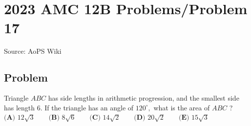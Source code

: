 \documentclass[12pt]{article}
\begin{document}
\section*{{2023 AMC 12B Problems/Problem 17}}
Source: AoPS Wiki

\subsection*{Problem}
Triangle $ABC$ has side lengths in arithmetic progression, and the smallest side has length $6.$ If the triangle has an angle of $120^\circ,$ what is the area of $ABC$ ? $\textbf{(A) }12\sqrt{3}\qquad\textbf{(B) }8\sqrt{6}\qquad\textbf{(C) }14\sqrt{2}\qquad\textbf{(D) }20\sqrt{2}\qquad\textbf{(E) }15\sqrt{3}$
\end{document}
